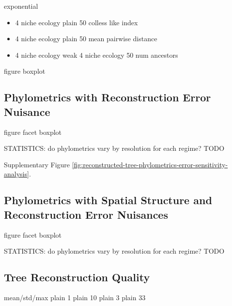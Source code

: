 exponential
\begin{itemize}
    \item 4 niche ecology	plain	50	colless like index
    \item 4 niche ecology	plain	50	mean pairwise distance
    \item 4 niche ecology	weak 4 niche ecology	50	num ancestors
\end{itemize}

figure boxplot


\subsection{Phylometrics with Reconstruction Error Nuisance}



figure facet boxplot

STATISTICS: do phylometrics vary by resolution for each regime?
TODO



Supplementary Figure \ref{fig:reconstructed-tree-phylometrics-error-sensitivity-analysis}.

\subsection{Phylometrics with Spatial Structure and Reconstruction Error Nuisances}

figure facet boxplot


STATISTICS: do phylometrics vary by resolution for each regime?
TODO




\subsection{Tree Reconstruction Quality}



mean/std/max
plain	1%
plain	10%
plain	3%
plain	33%



